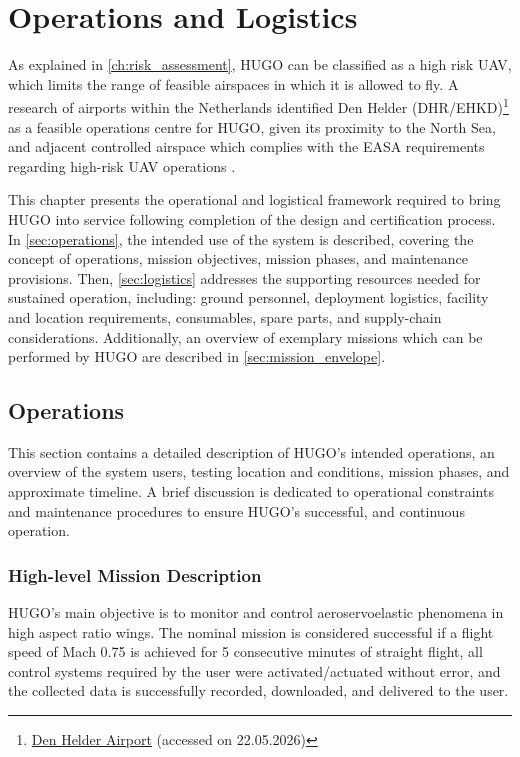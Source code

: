 \chapter{Operations and Logistics}
\label{ch:operation_and_logistics}
As explained in \autoref{ch:risk_assessment}, HUGO can be classified as a high risk UAV, which limits the range of feasible airspaces in which it is allowed to fly. A research of airports within the Netherlands  identified Den Helder (DHR/EHKD)\footnote{\href{https://denhelderairport.nl/eng/}{Den Helder Airport} (accessed on 22.05.2026)} as a feasible operations centre for HUGO, given its proximity to the North Sea, and adjacent controlled airspace which complies with the EASA requirements regarding high-risk UAV operations \cite{EASAInitialAirworthiness2025}. 

This chapter presents the operational and logistical framework required to bring HUGO into service following completion of the design and certification process. In \autoref{sec:operations}, the intended use of the system is described, covering the concept of operations, mission objectives, mission phases, and maintenance provisions. Then, \autoref{sec:logistics} addresses the supporting resources needed for sustained operation, including: ground personnel, deployment logistics, facility and location requirements, consumables, spare parts, and supply-chain considerations. Additionally, an overview of exemplary missions which can be performed by HUGO are described in \autoref{sec:mission_envelope}.


\section{Operations}
\label{sec:operations}
This section contains a detailed description of HUGO's intended operations, an overview of the system users, testing location and conditions, mission phases, and approximate timeline. A brief discussion is dedicated to operational constraints and maintenance procedures to ensure HUGO's successful, and continuous operation.


\subsection{High-level Mission Description}
HUGO's main objective is to monitor and control aeroservoelastic phenomena in high aspect ratio wings. The nominal mission is considered successful if a flight speed of Mach 0.75 is achieved for 5 consecutive minutes of straight flight, all control systems required by the user were activated/actuated without error, and the collected data is successfully recorded, downloaded, and delivered to the user.


